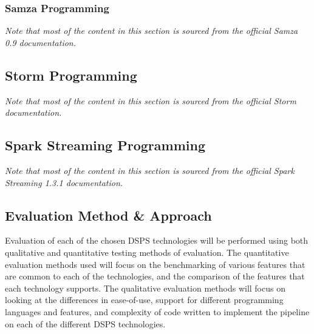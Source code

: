 \subsubsection{Samza Programming} %
\label{ssub:samza_programming}

\textit{Note that most of the content in this section is sourced from the official Samza 0.9 documentation.}~\cite{Samza:doc}







\subsection{Storm Programming} %
\label{sub:storm_programming}

\textit{Note that most of the content in this section is sourced from the official Storm documentation.}~\cite{Storm:doc}




\subsection{Spark Streaming Programming} %
\label{sub:spark_streaming_programming}

\textit{Note that most of the content in this section is sourced from the official Spark Streaming 1.3.1 documentation.}~\cite{Spark:doc}







\subsection{Evaluation Method \& Approach} %
\label{sub:evaluation_method_approach}

Evaluation of each of the chosen DSPS technologies will be performed using both qualitative and quantitative testing methods
of evaluation. The quantitative evaluation methods used will focus
on the benchmarking of various features that are common to each of the technologies, and the comparison of the features that
each technology supports. The qualitative evaluation methods will focus on looking at the differences in ease-of-use,
support for different programming languages and features, and complexity of code written to implement the pipeline on
each of the different DSPS technologies.

